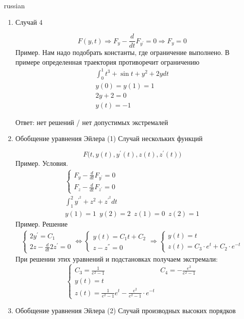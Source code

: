 \documentclass{article}
\begin{document}
\begin{otherlanguage*}{russian}
\begin{enumerate}
\item Случай 4 


\begin{equation}
F(y, t) \Rightarrow F_y - \frac{d}{dt} F_{y^{'}} = 0 \Rightarrow F_y = 0 
\end{equation}
Пример. Нам надо подобрать константы, где ограничение выполнено. В примере определенная траектория противоречит ограничению 
\begin{align}
\int_0^1 t ^3 + \sin t + y ^ 2 + 2 y dt \\
y(0) = y(1) = 1 \\
2 y + 2 = 0 \\
y(t) = - 1 
\end{align}

Ответ: нет решений / нет допустимых экстремалей

\item Обобщение уравнения Эйлера (1) Случай нескольких функций

\begin{equation}
F \big( t, y(t), y^{'} (t), z(t) , z^{'} (t) \big)
\end{equation}
Пример. Условия. 
\begin{align}
\begin{cases}
F_y - \frac{d}{dt} F_{y^{'}} = 0 \\
F_z - \frac{d}{dt} F_{z^{'}} = 0 
\end{cases} \\
\int_1^2 y^{'^{2}} + z ^ 2 + z ^{'^{2}} dt \\
y(1) = 1\,\,\, y(2) = 2 \,\,\, z(1) = 0 \,\,\, z(2) = 1 
\end{align}
Пример. Решение
\begin{align}
\begin{cases}
2y^{'} = C_1 \\
2z - \frac{d}{dt} 2 z^{'} = 0 
\end{cases} \Leftrightarrow \begin{cases}
y(t) = C_1 t + C_2 \\
z - z^{''} = 0 
\end{cases} \Rightarrow 
\begin{cases}
y(t) = t \\
z(t) = C_3 \cdot e^t + C_2 \cdot e^{-t} 
\end{cases}
\end{align}
При решении этих уравнений и подстановках получаем экстремали: 
\begin{equation}
\begin{cases}
C_3 = \frac{1}{e^2 - 1} & C_4 = - \frac{e^2}{e^2 - 1} \\
y(t) = t & \, \\
z(t) = \frac{1}{e^2 - 1} e^t - \frac{e^2}{e^2 - 1} \cdot e ^ {-t} & \,
\end{cases}
\end{equation}
\item Обобщение уравнения Эйлера (2) Случай производных высоких порядков 


\end{enumerate}
\end{otherlanguage*}
\end{document}
